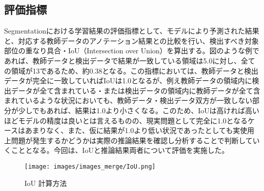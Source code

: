 \subsection{評価指標}
Segmentationにおける学習結果の評価指標として、モデルにより予測された結果と、対応する教師データのアノテーション結果との比較を行い、検出すべき対象部位の重なり具合・IoU（Intersection over Union）を算出する。図のような例であれば、教師データと検出データで結果が一致している領域は5.0に対し、全ての領域が13であるため、約0.38となる。この指標においては、教師データと検出データが完全に一致していればIoUは1.0となるが、例え教師データの領域内に検出データが全て含まれている・または検出データの領域内に教師データが全て含まれているような状況においても、教師データ・検出データ双方が一致しない部分が少しでもあれば、結果は1.0より小さくなる。このため、IoUは高ければ高いほどモデルの精度は良いとは言えるものの、現実問題として完全に1.0となるケースはあまりなく、また、仮に結果が1.0より低い状況であったとしても実使用上問題が発生するかどうかは実際の推論結果を確認し分析することで判断していくこととなる。今回は、IoUと推論結果両者について評価を実施した。
\\
\begin{figure}[h!]
\begin{center}
\texttt{[image: images/images\_merge/IoU.png]}
\caption{IoU 計算方法}
\end{center}
\label{fig:iou}
\end{figure}
